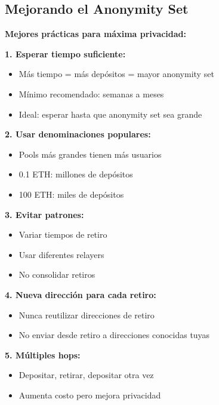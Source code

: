 \documentclass[11pt,a4paper,twoside]{book}
\begin{document}
\subsection{Mejorando el Anonymity Set}

\begin{keyidea}
\textbf{Mejores pr\'acticas para m\'axima privacidad:}

\textbf{1. Esperar tiempo suficiente:}
\begin{itemize}
    \item M\'as tiempo = m\'as dep\'ositos = mayor anonymity set
    \item M\'inimo recomendado: semanas a meses
    \item Ideal: esperar hasta que anonymity set sea grande
\end{itemize}

\textbf{2. Usar denominaciones populares:}
\begin{itemize}
    \item Pools m\'as grandes tienen m\'as usuarios
    \item 0.1 ETH: millones de dep\'ositos
    \item 100 ETH: miles de dep\'ositos
\end{itemize}

\textbf{3. Evitar patrones:}
\begin{itemize}
    \item Variar tiempos de retiro
    \item Usar diferentes relayers
    \item No consolidar retiros
\end{itemize}

\textbf{4. Nueva direcci\'on para cada retiro:}
\begin{itemize}
    \item Nunca reutilizar direcciones de retiro
    \item No enviar desde retiro a direcciones conocidas tuyas
\end{itemize}

\textbf{5. M\'ultiples hops:}
\begin{itemize}
    \item Depositar, retirar, depositar otra vez
    \item Aumenta costo pero mejora privacidad
\end{itemize}
\end{keyidea}

\end{document}
